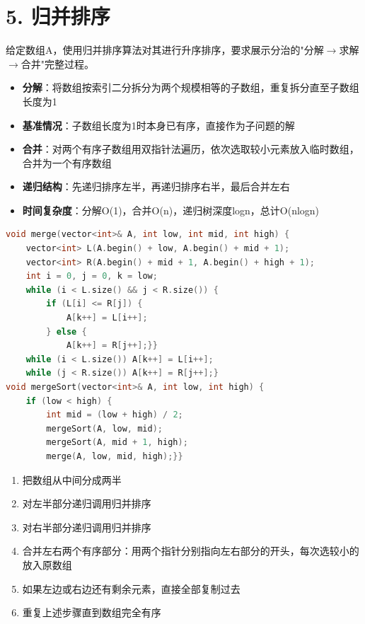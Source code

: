 \section*{5. 归并排序}

给定数组A，使用归并排序算法对其进行升序排序，要求展示分治的"分解$\to$求解$\to$合并"完整过程。

\begin{itemize}
    \item \textbf{分解}：将数组按索引二分拆分为两个规模相等的子数组，重复拆分直至子数组长度为1
    \item \textbf{基准情况}：子数组长度为1时本身已有序，直接作为子问题的解
    \item \textbf{合并}：对两个有序子数组用双指针法遍历，依次选取较小元素放入临时数组，合并为一个有序数组
    \item \textbf{递归结构}：先递归排序左半，再递归排序右半，最后合并左右
    \item \textbf{时间复杂度}：分解O(1)，合并O(n)，递归树深度logn，总计O(nlogn)
\end{itemize}

\begin{lstlisting}[language=C++, style=cppstyle]
void merge(vector<int>& A, int low, int mid, int high) {
    vector<int> L(A.begin() + low, A.begin() + mid + 1);
    vector<int> R(A.begin() + mid + 1, A.begin() + high + 1);
    int i = 0, j = 0, k = low;
    while (i < L.size() && j < R.size()) {
        if (L[i] <= R[j]) {
            A[k++] = L[i++];
        } else {
            A[k++] = R[j++];}}
    while (i < L.size()) A[k++] = L[i++];
    while (j < R.size()) A[k++] = R[j++];}
void mergeSort(vector<int>& A, int low, int high) {
    if (low < high) {
        int mid = (low + high) / 2;
        mergeSort(A, low, mid);
        mergeSort(A, mid + 1, high);
        merge(A, low, mid, high);}}
\end{lstlisting}

\begin{enumerate}
    \item 把数组从中间分成两半
    \item 对左半部分递归调用归并排序
    \item 对右半部分递归调用归并排序
    \item 合并左右两个有序部分：用两个指针分别指向左右部分的开头，每次选较小的放入原数组
    \item 如果左边或右边还有剩余元素，直接全部复制过去
    \item 重复上述步骤直到数组完全有序
\end{enumerate}
